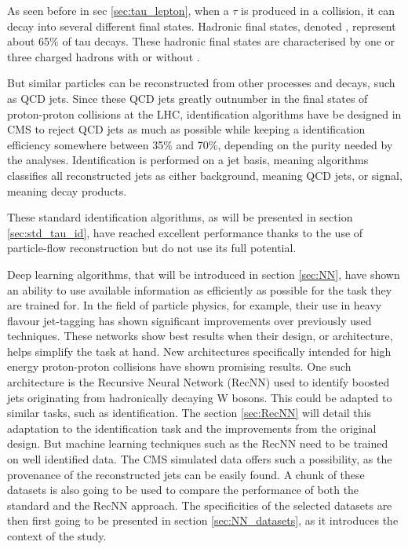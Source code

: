 
As seen before in sec \ref{sec:tau_lepton}, when a $\tau$ is produced in a collision, it can decay into several different final states.
Hadronic final states, denoted \tauh, represent about 65\% of tau decays.
These hadronic final states are characterised by one or three charged hadrons with or without \pizero .

But similar particles can be reconstructed from other processes and decays, such as QCD jets.
Since these QCD jets greatly outnumber \tauh in the final states of proton-proton collisions at the LHC, \tauh identification algorithms have be designed in CMS to reject QCD jets as much as possible while keeping a \tauh identification efficiency somewhere between 35\% and 70\%, depending on the purity needed by the analyses. Identification is performed on a jet basis, meaning algorithms classifies all reconstructed jets as either background, meaning QCD jets, or signal, meaning \tauh decay products.

These standard \tauh identification algorithms, as will be presented in section \ref{sec:std_tau_id}, have reached excellent performance thanks to the use of particle-flow reconstruction but do not use its full potential.

Deep learning algorithms, that will be introduced in section \ref{sec:NN}, have shown an ability to use available information as efficiently as possible for the task they are trained for. In the field of particle physics, for example, their use in heavy flavour jet-tagging \cite{btagging_NN} has shown significant improvements over previously used techniques. These networks show best results when their design, or architecture, helps simplify the task at hand. New architectures specifically intended for high energy proton-proton collisions have shown promising results. One such architecture is the Recursive Neural Network (RecNN) \cite{Louppe:2017ipp} used to identify boosted jets originating from hadronically decaying W bosons. This could be adapted to similar tasks, such as \tauh identification. The section \ref{sec:RecNN} will detail this adaptation to the \tauh identification task and the improvements from the original design. But machine learning techniques such as the RecNN need to be trained on well identified data. The CMS simulated data offers such a possibility, as the provenance of the reconstructed jets can be easily found. A chunk of these datasets is also going to be used to compare the performance of both the standard and the RecNN approach. The specificities of the selected datasets are then first going to be presented in section \ref{sec:NN_datasets}, as it introduces the context of the study.

